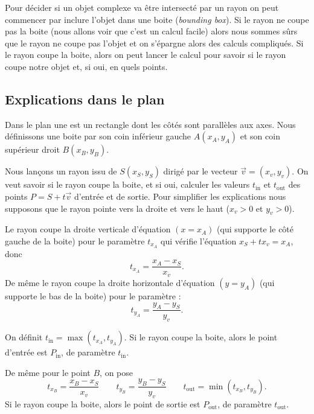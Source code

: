 \documentclass[11pt,class=report,crop=false]{standalone}
\begin{document}
Pour décider si un objet complexe va être intersecté par un rayon on peut commencer par inclure l'objet dans une boite (\emph{bounding box}). Si le rayon ne coupe pas la boite (nous allons voir que c'est un calcul facile) alors nous sommes sûrs que le rayon ne coupe pas l'objet et on s'épargne alors des calculs compliqués. Si le rayon coupe la boite, alors on peut lancer le calcul pour savoir si le rayon coupe notre objet et, si oui, en quels points.

\subsection{Explications dans le plan}


Dans le plan une  est un rectangle dont les côtés sont parallèles aux axes.
Nous définissons une boite par son coin inférieur gauche $A(x_A,y_A)$ et son coin supérieur droit $B(x_B,y_B)$.


Nous lançons un rayon issu de $S(x_S,y_S)$ dirigé par le vecteur $\vec v = (x_v,y_v)$.
On veut savoir si le rayon coupe la boite, et si oui, calculer les valeurs $t_{\text{in}}$ et $t_{\text{out}}$ des points $P = S + t \vec v$ d'entrée et de sortie.
Pour simplifier les explications nous supposons que le rayon pointe vers la droite et vers le haut ($x_v>0$ et $y_v>0$).



Le rayon coupe la droite verticale d'équation $(x=x_A)$ (qui supporte le côté gauche de la boite) pour le paramètre $t_{x_A}$ qui vérifie l'équation $x_S + t x_v = x_A$, donc 
$$t_{x_A} = \frac{x_A-x_S}{x_v}.$$
De même le rayon coupe la droite horizontale d'équation $(y=y_A)$ (qui supporte le bas de la boite) pour le paramètre :
$$t_{y_A} = \frac{y_A-y_S}{y_v}.$$


On définit $t_{\text{in}} = \max(t_{x_A},t_{y_A})$.
Si le rayon coupe la boite, alors le point d'entrée est $P_{\text{in}}$, de paramètre 
$t_{\text{in}}$.

De même pour le point $B$, on pose 
$$
t_{x_B} = \frac{x_B-x_S}{x_v} \qquad
t_{y_B} = \frac{y_B-y_S}{y_v} \qquad
t_{\text{out}} = \min(t_{x_B},t_{y_B}).$$
Si le rayon coupe la boite, alors le point de sortie est $P_{\text{out}}$, de paramètre 
$t_{\text{out}}$.
\end{document}
